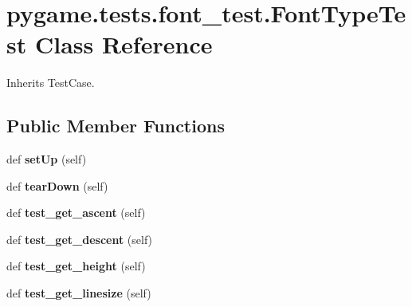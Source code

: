 \hypertarget{classpygame_1_1tests_1_1font__test_1_1_font_type_test}{}\section{pygame.\+tests.\+font\+\_\+test.\+Font\+Type\+Test Class Reference}
\label{classpygame_1_1tests_1_1font__test_1_1_font_type_test}


Inherits Test\+Case.

\subsection*{Public Member Functions}
\begin{DoxyCompactItemize}
\item 
\mbox{\label{classpygame_1_1tests_1_1font__test_1_1_font_type_test_a03d2c33a62f3a3cc72c9148f650e2284}} 
def {\bfseries set\+Up} (self)
\item 
\mbox{\label{classpygame_1_1tests_1_1font__test_1_1_font_type_test_a456abe77b28b367a6dfe07b3e5133ada}} 
def {\bfseries tear\+Down} (self)
\item 
\mbox{\label{classpygame_1_1tests_1_1font__test_1_1_font_type_test_a5e20637b179e8f367942c41950b49e46}} 
def {\bfseries test\+\_\+get\+\_\+ascent} (self)
\item 
\mbox{\label{classpygame_1_1tests_1_1font__test_1_1_font_type_test_a67c2072dc37101c36c024c379aaee2f9}} 
def {\bfseries test\+\_\+get\+\_\+descent} (self)
\item 
\mbox{\label{classpygame_1_1tests_1_1font__test_1_1_font_type_test_af18fe79b75008091116c236a3f4de56f}} 
def {\bfseries test\+\_\+get\+\_\+height} (self)
\item 
\mbox{\label{classpygame_1_1tests_1_1font__test_1_1_font_type_test_a650a39cb1d5c3e4110b09a7addff3b7a}} 
def {\bfseries test\+\_\+get\+\_\+linesize} (self)

\end{DoxyCompactItemize}
